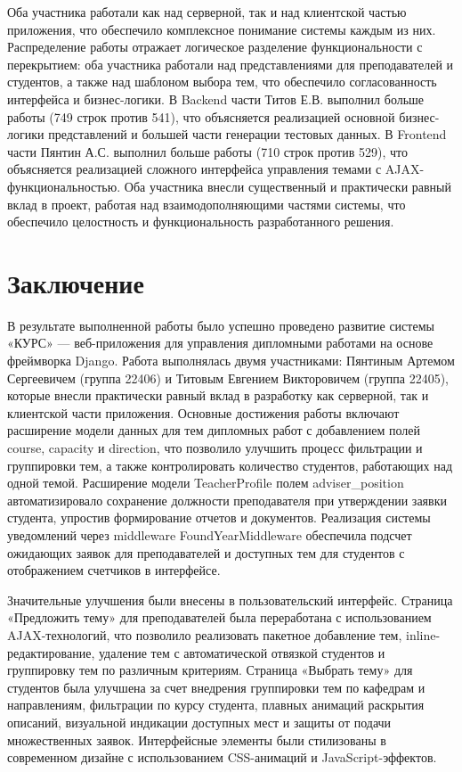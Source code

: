 \documentclass[a4paper,12pt]{article}
\begin{document}
Оба участника работали как над серверной, так и над клиентской частью приложения, что обеспечило комплексное понимание системы каждым из них. Распределение работы отражает логическое разделение функциональности с перекрытием: оба участника работали над представлениями для преподавателей и студентов, а также над шаблоном выбора тем, что обеспечило согласованность интерфейса и бизнес-логики. В Backend части Титов Е.В. выполнил больше работы (749 строк против 541), что объясняется реализацией основной бизнес-логики представлений и большей части генерации тестовых данных. В Frontend части Пянтин А.С. выполнил больше работы (710 строк против 529), что объясняется реализацией сложного интерфейса управления темами с AJAX-функциональностью. Оба участника внесли существенный и практически равный вклад в проект, работая над взаимодополняющими частями системы, что обеспечило целостность и функциональность разработанного решения.

\newpage
\section*{Заключение}

В результате выполненной работы было успешно проведено развитие системы «КУРС» — веб-приложения для управления дипломными работами на основе фреймворка Django. Работа выполнялась двумя участниками: Пянтиным Артемом Сергеевичем (группа 22406) и Титовым Евгением Викторовичем (группа 22405), которые внесли практически равный вклад в разработку как серверной, так и клиентской части приложения. Основные достижения работы включают расширение модели данных для тем дипломных работ с добавлением полей course, capacity и direction, что позволило улучшить процесс фильтрации и группировки тем, а также контролировать количество студентов, работающих над одной темой. Расширение модели TeacherProfile полем adviser\_position автоматизировало сохранение должности преподавателя при утверждении заявки студента, упростив формирование отчетов и документов. Реализация системы уведомлений через middleware FoundYearMiddleware обеспечила подсчет ожидающих заявок для преподавателей и доступных тем для студентов с отображением счетчиков в интерфейсе.

Значительные улучшения были внесены в пользовательский интерфейс. Страница «Предложить тему» для преподавателей была переработана с использованием AJAX-технологий, что позволило реализовать пакетное добавление тем, inline-редактирование, удаление тем с автоматической отвязкой студентов и группировку тем по различным критериям. Страница «Выбрать тему» для студентов была улучшена за счет внедрения группировки тем по кафедрам и направлениям, фильтрации по курсу студента, плавных анимаций раскрытия описаний, визуальной индикации доступных мест и защиты от подачи множественных заявок. Интерфейсные элементы были стилизованы в современном дизайне с использованием CSS-анимаций и JavaScript-эффектов.
\end{document}
